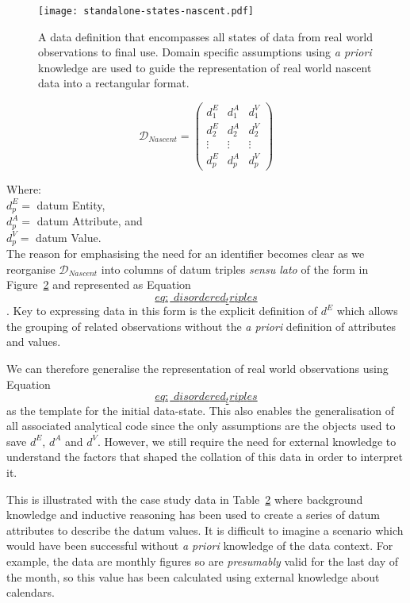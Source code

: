 \documentclass[
]{article}
\begin{document}
\begin{figure}
\hypertarget{Fig-theory-nascent-data}{%
\centering
\texttt{[image: standalone-states-nascent.pdf]}
\caption{A data definition that encompasses all states of data from real
world observations to final use. Domain specific assumptions using
\emph{a priori} knowledge are used to guide the representation of real
world nascent data into a rectangular
format.}\label{Fig-theory-nascent-data}
}
\end{figure}

\[\label{eq:_disordered_triples}
    \mathscr{D}_{Nascent} =
    \begin{pmatrix}
        d^{E} _{1} & d^{A} _{1}  & d^{V} _{1}   \\
        d^{E} _{2} & d^{A} _{2}  & d^{V} _{2}  \\
        \vdots  & \vdots  & \vdots   \\
        d^{E} _{p} & d^{A} _{p}  & d^{V} _{p}
    \end{pmatrix}\]

Where:\\
\(d^{E} _{p} =\) datum Entity,\\
\(d^{A} _{p} =\) datum Attribute, and\\
\(d^{V} _{p} =\) datum Value.\\
The reason for emphasising the need for an identifier becomes clear as
we reorganise \(\mathscr{D}_{Nascent}\) into columns of datum triples
\emph{sensu lato} of the form in
Figure~\protect\hyperlink{Fig-theory-nascent-data}{2} and represented as
Equation~\protect\hyperlink{eq:_disordered_triples}{\[eq:\_disordered_triples\]}.
Key to expressing data in this form is the explicit definition of
\(d^{E}\) which allows the grouping of related observations without the
\emph{a priori} definition of attributes and values.

We can therefore generalise the representation of real world
observations using
Equation~\protect\hyperlink{eq:_disordered_triples}{\[eq:\_disordered_triples\]}
as the template for the initial data-state. This also enables the
generalisation of all associated analytical code since the only
assumptions are the objects used to save \(d^{E}\), \(d^{A}\) and
\(d^{V}\). However, we still require the need for external knowledge to
understand the factors that shaped the collation of this data in order
to interpret it.

This is illustrated with the case study data in
Table~\protect\hyperlink{Tab:DatumTriples}{2} where background knowledge
and inductive reasoning has been used to create a series of datum
attributes to describe the datum values. It is difficult to imagine a
scenario which would have been successful without \emph{a priori}
knowledge of the data context. For example, the data are monthly figures
so are \emph{presumably} valid for the last day of the month, so this
value has been calculated using external knowledge about calendars.
\end{document}
